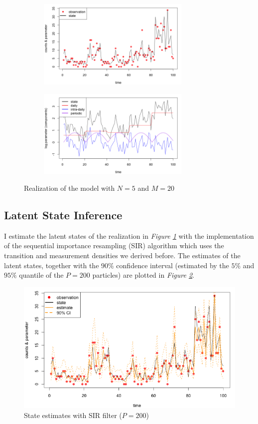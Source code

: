 \documentclass[11pt, oneside]{scrreprt}   	%
\begin{document}
\begin{figure}[h!]
\centering
\begin{subfigure}{.5\textwidth}
  \centering
  \includegraphics[width=73mm]{../../images/hdpm-realization.png}
\end{subfigure}%
\begin{subfigure}{.5\textwidth}
  \centering
  \includegraphics[width=73mm]{../../images/hdpm-log-param.png}
\end{subfigure}
\caption{Realization of the model with $N=5$ and $M=20$}
\label{fig:hdpm_realization}
\end{figure}

\subsection{Latent State Inference}
I estimate the latent states of the realization in \textit{Figure \ref{fig:hdpm_realization}} with the implementation of the sequential importance resampling (SIR) algorithm which uses the transition and measurement densities we derived before. The estimates of the latent states, together with the $90\%$ confidence interval (estimated by the $5\%$ and $95\%$ quantile of the $P=200$ particles) are plotted in \textit{Figure \ref{fig:hdpm_est}}.

\begin{figure}[h!]
\centering
\includegraphics[width=115mm]{../../images/hdpm-est.png}
\caption{State estimates with SIR filter ($P=200$)}
\label{fig:hdpm_est}
\end{figure}
\end{document}
